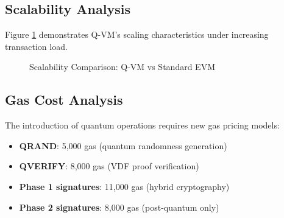 \documentclass[11pt]{article}
\begin{document}
\subsection{Scalability Analysis}

Figure \ref{fig:scalability} demonstrates Q-VM's scaling characteristics under increasing transaction load.

\begin{figure}[htbp]
    \centering
    \caption{Scalability Comparison: Q-VM vs Standard EVM}
    \label{fig:scalability}
\end{figure}

\subsection{Gas Cost Analysis}

The introduction of quantum operations requires new gas pricing models:

\begin{itemize}
    \item \textbf{QRAND}: 5,000 gas (quantum randomness generation)
    \item \textbf{QVERIFY}: 8,000 gas (VDF proof verification)
    \item \textbf{Phase 1 signatures}: 11,000 gas (hybrid cryptography)
    \item \textbf{Phase 2 signatures}: 8,000 gas (post-quantum only)
\end{itemize}
\end{document}
